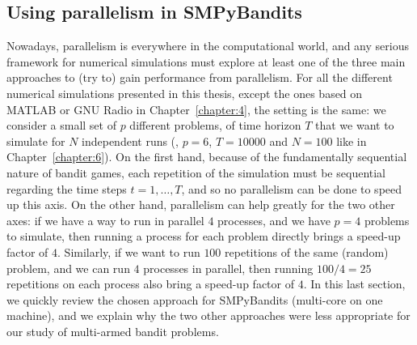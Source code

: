 \begin{small}
    \inputminted[linenos=true,numbersep=5pt,frame=lines,framesep=2mm]{python3}{2-Chapters/3-Chapter/src/example_of_configuration_singleplayer.py}
\end{small}


\subsection{Using parallelism in SMPyBandits}
\label{sub:3:parallelSimulations}

Nowadays, parallelism is everywhere in the computational world, and any serious framework for numerical simulations must explore at least one of the three main approaches to (try to) gain performance from parallelism.
%
For all the different numerical simulations presented in this thesis, except the ones based on MATLAB or GNU Radio in Chapter~\ref{chapter:4}, the setting is the same: we consider a small set of $p$ different problems, of time horizon $T$ that we want to simulate for $N$ independent runs (\eg, $p=6$, $T=10000$ and $N=100$ like in Chapter~\ref{chapter:6}).
On the first hand, because of the fundamentally sequential nature of bandit games, each repetition of the simulation must be sequential regarding the time steps $t=1,\dots,T$, and so no parallelism can be done to speed up this axis.
On the other hand, parallelism can help greatly for the two other axes: if we have a way to run in parallel $4$ processes, and we have $p=4$ problems to simulate, then running a process for each problem directly brings a speed-up factor of $4$.
Similarly, if we want to run $100$ repetitions of the same (random) problem, and we can run $4$ processes in parallel, then running $100/4=25$ repetitions on each process also bring a speed-up factor of $4$.
%
In this last section, we quickly review the chosen approach for SMPyBandits (multi-core on one machine), and we explain why the two other approaches were less appropriate for our study of multi-armed bandit problems.

